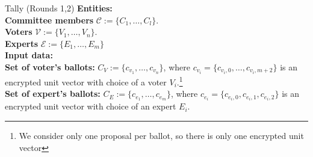 \begin{boxfig}{\label{fig:tally1}Tally (Rounds 1,2)}{}
\footnotesize
\textbf{Entities:}\\
    \hspace*{6mm} \textbf{Committee members} $\mathcal{C}:=\{C_1,\ldots, C_l \}$.\\
    \hspace*{6mm} \textbf{Voters} $\mathcal{V}:=\{V_1,\ldots, V_n \}$.\\
    \hspace*{6mm} \textbf{Experts} $\mathcal{E}:=\{E_1,\ldots, E_m \}$\\

\textbf{Input data:}\\
    \hspace*{6mm} \textbf{Set of voter's ballots:} $C_V:=\{c_{v_1},\ldots, c_{v_n} \}$, where $c_{v_i}=\{c_{v_i,0},\ldots,c_{v_i,m+2}\}$ is an encrypted unit vector with choice of a voter $V_i$.\footnote{\label{note1}We consider only one proposal per ballot, so there is only one encrypted unit vector}\\
    \hspace*{6mm} \textbf{Set of expert's ballots:} $C_E:=\{c_{e_1},\ldots, c_{e_m} \}$, where $c_{e_i}=\{c_{e_i,0},c_{e_i,1},c_{e_i,2}\}$ is an encrypted unit vector with choice of an expert $E_i$.\\


\end{boxfig}
